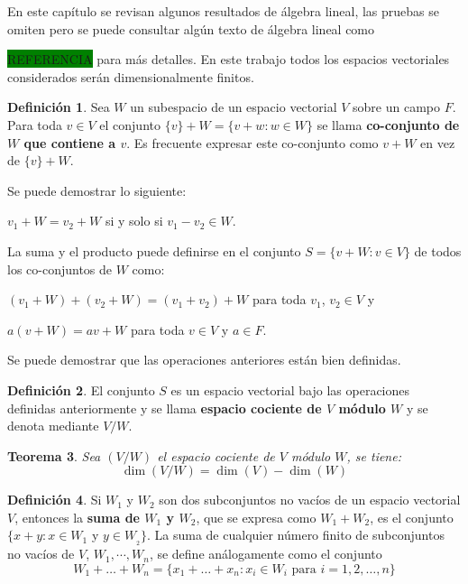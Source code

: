 \documentclass[12pt]{book}
\newtheorem{theorem}{Teorema}[section]
\theoremstyle{definition}
\newtheorem{definition}[theorem]{Definición}
\newcounter{in}
\newcounter{ini}
\begin{document}
En este capítulo se revisan algunos resultados de álgebra lineal, las
pruebas se omiten pero se puede consultar algún texto de álgebra
lineal como {\setlength{\fboxsep}{0pt}\colorbox{green}{REFERENCIA}
  para más  detalles. En este trabajo todos los espacios vectoriales considerados serán dimensionalmente finitos.

\begin{definition}
  Sea $W$ un subespacio de un espacio vectorial $V$ sobre un campo
  $F$. Para toda $v\in V$ el conjunto $\{v\}+W=\{v+w:w\in W\}$ se
  llama \textbf{co-conjunto de $W$ que contiene a $v$}. Es frecuente
  expresar este co-conjunto como $v+W$ en vez de $\{v\}+W$. 
\end{definition}

Se puede demostrar lo siguiente:
 
$v_{1}+W=v_{2}+W$ si y solo si $v_{1}-v_{2}\in W.$

La suma y el producto puede definirse en el conjunto $S=\{v+W:v\in V\}$ de todos los co-conjuntos de $W$ como: 

$(v_{1}+W)+(v_{2}+W)=(v_{1}+v_{2})+W$ para toda $v_{1}$, $v_{2}\in V$ y

$a(v+W)=av+W$ para toda $v\in V$ y $a\in F$.

Se puede demostrar que las operaciones anteriores están bien definidas.

\begin{definition}
  El conjunto $S$ es un espacio vectorial bajo las operaciones
  definidas anteriormente y se llama \textbf{espacio cociente de $V$ módulo $W$} y se denota mediante $V/W$. 
\end{definition}

\begin{theorem}
  \label{dim-esp-coc}
  Sea $(V/W)$ el espacio cociente de $V$ módulo $W$, se tiene:
  $$\dim(V/W)=\dim(V)-\dim(W)$$
\end{theorem}

\begin{definition}
  Si $W_{1}$ y $W_{2}$ son dos subconjuntos no vacíos de un espacio
  vectorial $V$, entonces la \textbf{suma de $W_{1}$ y $W_{2}$}, que se
  expresa como $W_{1}+W_{2}$, es el conjunto $\{x+y:x\in W_{1}$ y $y\in
  W_{_2}\}$. La suma de cualquier número finito de subconjuntos no
  vacíos de $V$, $W_{1},\cdots,W_{n}$, se define análogamente como el
  conjunto
  $$W_{1}+\ldots+W_{n}=\{x_{1}+\ldots+x_{n}: x_{i}\in W_{i} \mbox{ para }i=1,2,\ldots,n\}$$
\end{definition}

}
\end{document}
